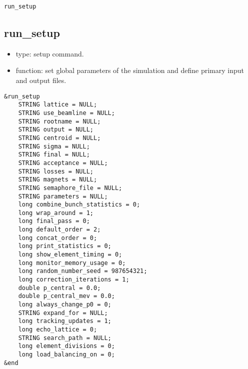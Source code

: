 \documentclass[11pt]{article}
\begin{document}
\newpage
\begin{center}{\Large\verb|run_setup|}\end{center}
\subsection{run\_setup \label{subsec:runsetup}}

\begin{itemize}
\item type: setup command.
\item function: set global parameters of the simulation and define primary input and output files.
\end{itemize}

\begin{verbatim}
&run_setup
    STRING lattice = NULL;
    STRING use_beamline = NULL;
    STRING rootname = NULL;
    STRING output = NULL;
    STRING centroid = NULL;
    STRING sigma = NULL;
    STRING final = NULL;
    STRING acceptance = NULL;
    STRING losses = NULL;
    STRING magnets = NULL;
    STRING semaphore_file = NULL;
    STRING parameters = NULL;
    long combine_bunch_statistics = 0;
    long wrap_around = 1;
    long final_pass = 0;
    long default_order = 2;
    long concat_order = 0;
    long print_statistics = 0;
    long show_element_timing = 0;
    long monitor_memory_usage = 0;
    long random_number_seed = 987654321;
    long correction_iterations = 1;
    double p_central = 0.0;
    double p_central_mev = 0.0;
    long always_change_p0 = 0;
    STRING expand_for = NULL; 
    long tracking_updates = 1;
    long echo_lattice = 0;
    STRING search_path = NULL;
    long element_divisions = 0;
    long load_balancing_on = 0;
&end
\end{verbatim}
\end{document}
